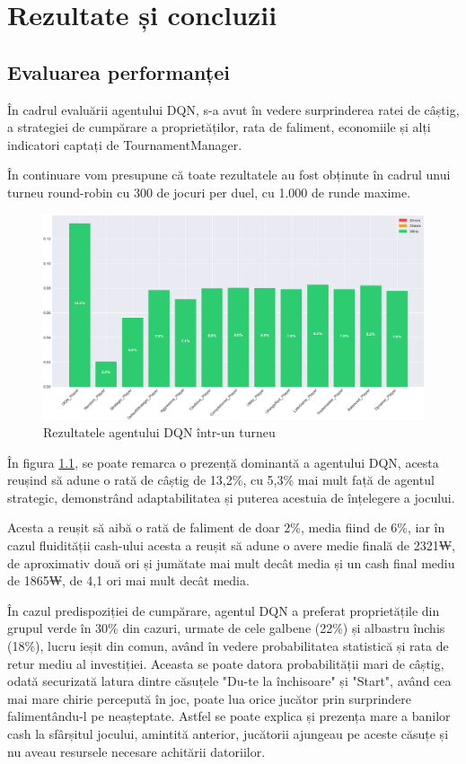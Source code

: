 \chapter{Rezultate și concluzii}
\section{Evaluarea performanței}
În cadrul evaluării agentului DQN, s-a avut în vedere surprinderea ratei de câștig, a strategiei de cumpărare a proprietăților, rata de faliment, economiile și alți indicatori captați de TournamentManager.

În continuare vom presupune că toate rezultatele au fost obținute în cadrul unui turneu round-robin cu 300 de jocuri per duel, cu 1.000 de runde maxime.

\begin{figure}[H]
    \centering
    \includegraphics[width=16cm]{images/dqn_tournament_win_rates.png}
    \caption{Rezultatele agentului DQN într-un turneu}
    \label{fig:dqn-tournament-results}
\end{figure}

În figura \ref{fig:dqn-tournament-results}, se poate remarca o prezență dominantă a agentului DQN, acesta reușind să adune o rată de câștig de 13,2\%, cu 5,3\% mai mult față de agentul strategic, demonstrând adaptabilitatea și puterea acestuia de înțelegere a jocului.

Acesta a reușit să aibă o rată de faliment de doar 2\%, media fiind de 6\%, iar în cazul fluidității cash-ului acesta a reușit să adune o avere medie finală de 2321₩, de aproximativ două ori și jumătate mai mult decât media și un cash final mediu de 1865₩, de 4,1 ori mai mult decât media.

În cazul predispoziției de cumpărare, agentul DQN a preferat proprietățile din grupul verde în 30\% din cazuri, urmate de cele galbene (22\%) și albastru închis (18\%), lucru ieșit din comun, având în vedere probabilitatea statistică și rata de retur mediu al investiției. Aceasta se poate datora probabilității mari de câștig, odată securizată latura dintre căsuțele "Du-te la închisoare" și "Start", având cea mai mare chirie percepută în joc, poate lua orice jucător prin surprindere falimentându-l pe neașteptate. Astfel se poate explica și prezența mare a banilor cash la sfârșitul jocului, amintită anterior, jucătorii ajungeau pe aceste căsuțe și nu aveau resursele necesare achitării datoriilor.

